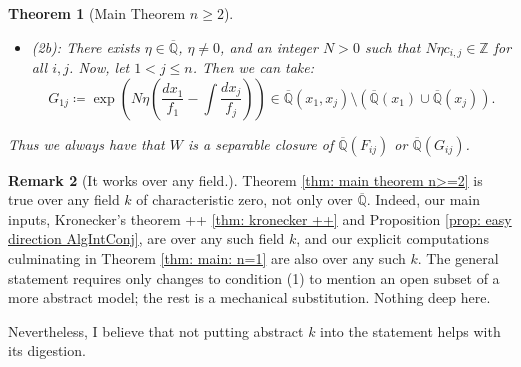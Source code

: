 \documentclass{amsart}
\newcommand{\op}{\operatorname}
\newtheorem{thm}{Theorem}[section]
\theoremstyle{definition}
\newtheorem{remark}[thm]{Remark}
\begin{document}
\begin{thm}[Main Theorem $n\ge 2$]
\begin{itemize}
        
    \item (2b): There exists $\eta \in \overline{\mathbb{Q}}$, $\eta \ne 0$, and an integer $N>0$ such that $N\eta c_{i,j}\in \mathbb{Z}$ for all $i,j$. Now, let $1<j\le n$. Then we can take:
    \begin{equation}
        G_{1j} \coloneqq \op{exp}\left(N\eta \left(\frac{dx_1}{f_1}-\int \frac{dx_j}{f_j}\right)\right)\in \overline{\mathbb{Q}}(x_1,x_j)\setminus \left(\overline{\mathbb{Q}}(x_1)\cup \overline{\mathbb{Q}}(x_j)\right).
    \end{equation}
\end{itemize}
    Thus we always have that $W$ is a separable closure of $\overline{\mathbb{Q}}(F_{ij})$ or $\overline{\mathbb{Q}}(G_{ij})$. 
\end{thm}

\begin{remark}[It works over any field.]
    Theorem \ref{thm: main theorem n>=2} is true over any field $k$ of characteristic zero, not only over $\overline{\mathbb{Q}}$. Indeed, our main inputs, Kronecker's theorem ++ \ref{thm: kronecker ++} and Proposition \ref{prop: easy direction AlgIntConj}, are over any such field $k$, and our explicit computations culminating in Theorem \ref{thm: main: n=1} are also over any such $k$. The general statement requires only changes to condition (1) to mention an open subset of a more abstract model; the rest is a mechanical substitution. Nothing deep here.

    Nevertheless, I believe that not putting abstract $k$ into the statement helps with its digestion.
\end{remark}
\end{document}

